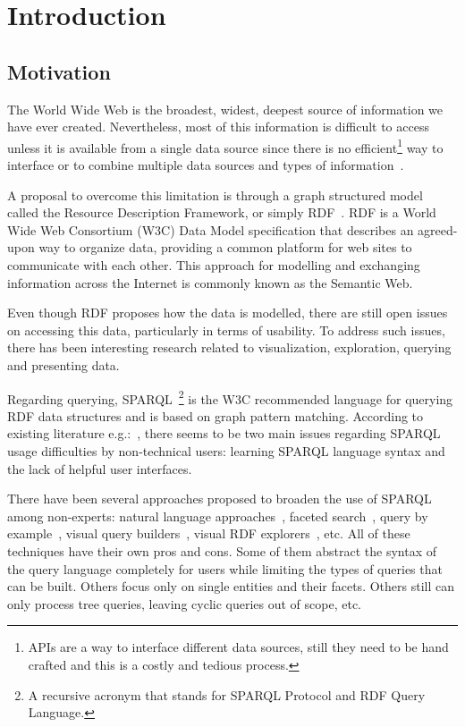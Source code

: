 \chapter{Introduction}

\section{Motivation}
\label{chap:motivation}

The World Wide Web is the broadest, widest, deepest source of information we have ever created. 
Nevertheless, most of this information is difficult to access unless it is available from a single data source since there is no efficient\footnote{APIs are a way to interface different data sources, 
still they need to be hand crafted and this is a costly and tedious process.} way to interface or to combine multiple data sources and types of information~\cite{W3CDesignIssues}.

A proposal to overcome this limitation is through a graph structured model called the Resource Description Framework, or simply RDF~\cite{rdfprimer11}. 
RDF is a World Wide Web Consortium (W3C) Data Model specification that describes an agreed-upon way to organize data, 
providing a common platform for web sites to communicate with each other. 
This approach for modelling and exchanging information across the Internet is commonly known as the Semantic Web.

Even though RDF proposes how the data is modelled, there are still open issues on accessing this data, particularly in terms of usability. 
To address such issues, there has been interesting research related to visualization, exploration, querying and presenting data.

Regarding querying, SPARQL~\cite{SPARQL}\footnote{A recursive acronym that stands for SPARQL Protocol and RDF Query Language.} is the W3C recommended language for querying RDF data structures and is based on graph pattern matching. According to existing literature e.g.:~\cite{Ferre2016, Lehmann2014, Unger2014}, there seems to be two main issues regarding SPARQL usage difficulties by non-technical users: learning SPARQL language syntax and the lack of helpful user interfaces.

There have been several approaches proposed to broaden the use of SPARQL among non-experts: 
natural language approaches~\cite{Ngomo2013, Lehmann2013, Rico2015, Ngomo2019}, faceted search~\cite{Arenas2016, Moreno2018}, 
query by example~\cite{Clemmer2011, Diaz2016}, 
visual query builders~\cite{Dadzie2011, Vargas2019}, visual RDF explorers~\cite{Bikakis2016, Rietveld2016}, etc. 
All of these techniques have their own pros and cons. 
Some of them abstract the syntax of the query language completely for users while limiting the types of queries that can be built. 
Others focus only on single entities and their facets. 
Others still can only process tree queries, leaving cyclic queries out of scope, etc. 


